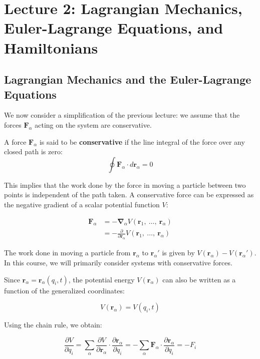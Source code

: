 \section{Lecture 2: Lagrangian Mechanics, Euler-Lagrange Equations, and Hamiltonians}

\subsection{Lagrangian Mechanics and the Euler-Lagrange Equations}

We now consider a simplification of the previous lecture:  we assume that the forces 
$\mathbf{F}_\alpha$ acting on the system are conservative.

\begin{definition}
A force $\mathbf{F}_\alpha$ is said to be \textbf{conservative} if the line integral of 
the force over any closed path is zero:
\[
    \oint \mathbf{F}_\alpha \cdot d\mathbf{r}_\alpha = 0
\]
\end{definition}

This implies that the work done by the force in moving a particle between two points is 
independent of the path taken.  A conservative force can be expressed as the negative 
gradient of a scalar potential function $V$:

\begin{align*}
    \mathbf{F}_\alpha &= -\mathbf{\nabla}_\alpha V(\mathbf{r}_1,\ \dots,\ \mathbf{r}_\alpha) \\
    &= - \frac{\partial}{\partial \mathbf{r}_\alpha} V(\mathbf{r}_1,\ \dots,\ \mathbf{r}_\alpha)
\end{align*}

The work done in moving a particle from $\mathbf{r}_\alpha$ to $\mathbf{r}_\alpha'$ is 
given by $V(\mathbf{r}_\alpha) - V(\mathbf{r}_\alpha')$. In this course, we will 
primarily consider systems with conservative forces.

Since $\mathbf{r}_\alpha=\mathbf{r}_\alpha(q_i, t)$, the potential energy 
$V(\mathbf{r}_\alpha)$ can also be written as a function of the generalized coordinates:

\[
    V(\mathbf{r}_\alpha)=V(q_i, t)
\]

Using the chain rule, we obtain:

\[
    \frac{\partial V}{\partial q_i}=\sum_\alpha \frac{\partial V}{\partial \mathbf{r}_\alpha} \cdot \frac{\partial \mathbf{r}_\alpha}{\partial q_i}=-\sum_\alpha \mathbf{F}_\alpha \cdot \frac{\partial \mathbf{r}_\alpha}{\partial q_i}=-F_i
\]

